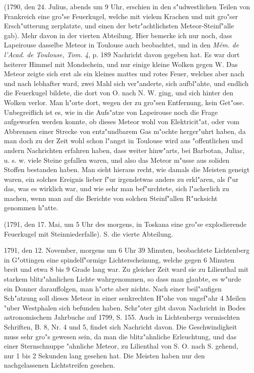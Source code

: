 \documentclass[a4paper, 11pt, oneside, polutonikogreek, german]{article}
\begin{document}
(1790, den 24. Julius, abends um 9 Uhr, erschien in den s"udwestlichen Teilen von Frankreich eine gro"se Feuerkugel, welche mit vielem Krachen und mit gro"ser Ersch"utterung zerplatzte, und einen der betr"achtlichsten Meteor-Steinf"alle gab). Mehr davon in der vierten Abteilung. Hier bemerke ich nur noch, dass Lapeirouse dasselbe Meteor in Toulouse auch beobachtet, und in den \emph{Mém. de l'Acad. de Toulouse, Tom. 4}, p. 189 Nachricht davon gegeben hat. Es war dort heiterer Himmel mit Mondschein, und nur einige kleine Wolken gegen W. Das Meteor zeigte sich erst als ein kleines mattes und rotes Feuer, welches aber nach und nach lebhafter ward, zwei Mahl sich ver"anderte, sich aufbl"ahte, und endlich die Feuerkugel bildete, die dort von O. nach N. W. ging, und sich hinter den Wolken verlor. Man h"orte dort, wegen der zu gro"sen Entfernung, kein Get"ose. Unbegreiflich ist es, wie in die Aufs"atze von Lapeirouse noch die Frage aufgeworfen werden konnte, ob dieses Meteor wohl von Elektricit"at, oder vom Abbrennen einer Strecke von entz"undbarem Gas m"ochte herger"uhrt haben, da man doch zu der Zeit wohl schon l"angst in Toulouse wird aus "offentlichen und andern Nachrichten erfahren haben, dass weiter hinw"arts, bei Barbotan, Juliac, u. s. w. viele Steine gefallen waren, und also das Meteor m"usse aus soliden Stoffen bestanden haben. Man sieht hieraus recht, wie damals die Meisten geneigt waren, ein solches Ereignis lieber f"ur irgendetwas anders zu erkl"aren, als f"ur das, was es wirklich war, und wie sehr man bef"urchtete, sich l"acherlich zu machen, wenn man auf die Berichte von solchen Steinf"allen R"ucksicht genommen h"atte.

(1791, den 17. Mai, um 5 Uhr des morgens, in Toskana eine gro"se explodierende Feuerkugel mit Steinniederfalle). S. die vierte Abteilung.

1791, den 12. November, morgens um 6 Uhr 39 Minuten, beobachtete Lichtenberg in G"ottingen eine spindelf"ormige Lichterscheinung, welche gegen 6 Minuten breit und etwa 8 bis 9 Grade lang war. Zu gleicher Zeit ward sie zu Lilienthal mit starkem blitz"ahnlichen Lichte wahrgenommen, so dass man glaubte, es w"urde ein Donner darauffolgen, man h"orte aber nichts. Nach einer beil"aufigen Sch"atzung soll dieses Meteor in einer senkrechten H"ohe von ungef"ahr 4 Meilen "uber Westphalen sich befunden haben. Schr"oter gibt davon Nachricht in Bodes astronomischem Jahrbuche auf 1799, S. 155. Auch in Lichtenbergs vermischten Schriften, B. 8, Nr. 4 und 5, findet sich Nachricht davon. Die Geschwindigkeit muss sehr gro"s gewesen sein, da man die blitz"ahnliche Erleuchtung, und das einer Sternschnuppe "ahnliche Meteor, zu Lilienthal von S. O. nach S. gehend, nur 1 bis 2 Sekunden lang gesehen hat. Die Meisten haben nur den nachgelassenen Lichtstreifen gesehen.
\end{document}
